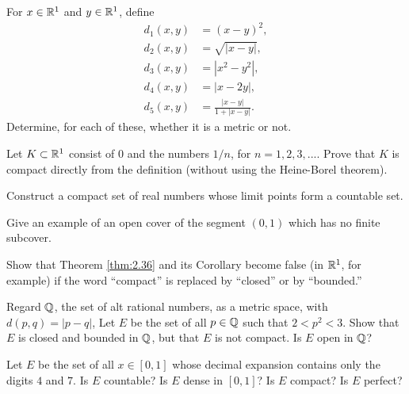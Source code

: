 \begin{myExercise}
    \label{ex:2.11}
    For $x \in {\protect\mathbb R}^1$ and $y \in {\protect\mathbb R}^1$, define
    \begin{align*}
        d_1(x,y) &= (x-y)^2, \\
        d_2(x,y) &= \sqrt{|x-y|}, \\
        d_3(x,y) &= |x^2-y^2|, \\
        d_4(x,y) &= |x-2y|, \\
        d_5(x,y) &= \frac{|x-y|}{1+|x-y|}.
    \end{align*}
    Determine, for each of these, 
    whether it is a metric or not.
\end{myExercise}

\begin{myExercise}
    \label{ex:2.12}
    Let $K \subset {\protect\mathbb R}^1$ consist of $0$ and the numbers $1/n$, 
    for $n = 1, 2, 3, ...$. 
    Prove that $K$ is compact directly from the definition 
    (without using the Heine-Borel theorem).
\end{myExercise}

\begin{myExercise}
    \label{ex:2.13}
    Construct a compact set of real numbers whose limit points form a countable set.
\end{myExercise}

\begin{myExercise}
    \label{ex:2.14}
    Give an example of an open cover of the segment $(0, 1)$ 
    which has no finite subcover.
\end{myExercise}

\begin{myExercise}
    \label{ex:2.15}
    Show that Theorem \ref{thm:2.36} and its Corollary become false 
    (in ${\protect\mathbb R}^1$, for example) 
    if the word ``compact'' is replaced by ``closed'' or by ``bounded.''
\end{myExercise}

\begin{myExercise}
    \label{ex:2.16}
    Regard ${\protect\mathbb Q}$, the set of alt rational numbers, as a metric space, 
    with $d(p, q) = |p - q|$,
    Let $E$ be the set of all $p \in {\protect\mathbb Q}$ such that $2 < p^2 < 3$. 
    Show that $E$ is closed and bounded in ${\protect\mathbb Q}$, 
    but that $E$ is not compact. 
    Is $E$ open in ${\protect\mathbb Q}$?
\end{myExercise}

\begin{myExercise}
    \label{ex:2.17}
    Let $E$ be the set of all $x \in [0, 1]$ 
    whose decimal expansion contains only the digits $4$ and $7$. 
    Is $E$ countable? 
    Is $E$ dense in $[0, 1]$? 
    Is $E$ compact? 
    Is $E$ perfect?
\end{myExercise}

